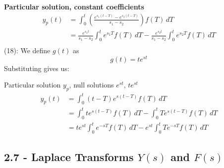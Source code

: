 \documentclass[a4paper]{article}
\begin{document}
\textbf{Particular solution, constant coefficients}
\begin{align*}
	y_{p } \!\left( t  \right) & = \int_{0}^{t } \!\left( \frac{e^{s_{1}\!\left( t - T  \right)} - e^{s_{2}\!\left( t - T  \right)}}{s_{1} - s_{2}} \right)f \!\left( T  \right) \, dT  \\
	 & = \frac{e^{s_{1}t }}{s_{1} - s_{2}} \int_{0}^{t } e^{s_{1}T } f \!\left( T  \right) \, dT - \frac{e^{s_{2}t }}{s_{1} - s_{2}} \int_{0}^{t } e^{s_{2}T } f \!\left( T  \right) \, dT   \\ 
\end{align*}
(18): We define \( g \!\left( t  \right) \) as 
\[
	g \!\left( t  \right) = te^{st } 
\]
Substituting gives us:

Particular solution \( y_{p } \), null solutions \( e^{st } \), \( te^{st } \)
\begin{align*}
	y_{p }\!\left( t  \right) & = \int_{0}^{t } \!\left( t - T  \right)e^{s \!\left( t - T  \right)} f \!\left( T  \right) \, dT \\
	 & = \int_{0}^{t } te^{s \!\left( t - T  \right)} f \!\left( T  \right) \, dT - \int_{0}^{t } Te^{s \!\left( t - T  \right)} f \!\left( T  \right) \, dT \\ 
	 & = te^{st} \int_{0}^{t } e^{-sT } f \!\left( T  \right) \, dT - e^{st } \int_{0}^{t } Te^{-sT } f \!\left( T  \right) \, dT  
\end{align*}

\newpage
\subsection{\textsf{2.7 - Laplace Transforms \texorpdfstring{\( Y \!\left( s  \right) \) and \( F \!\left( s \right) \)}{Y(s) and F(s)}}}

\end{document}
